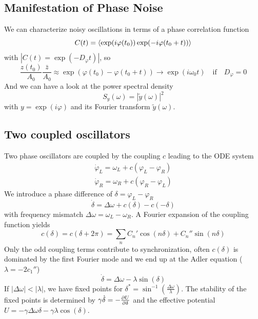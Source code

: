 \documentclass{notebook}
\begin{document}
\subsection*{Manifestation of Phase Noise}

We can characterize noisy oscillations in terms of a phase correlation function
%
\begin{equation}
C(t) = \expval{\exp(i \varphi(t_0)) \exp(-i \varphi(t_0 + t))}
\end{equation}
%
with $|C(t) = \exp(-D_{\varphi} t)|$, so
%
\begin{equation*}
	\frac{z(t_0)}{A_0} \frac{\bar{z}}{A_0} \approx \exp(\varphi(t_0)-\varphi(t_0+t)) \to \exp(i \omega_0 t) \quad \mathrm{if} \quad D_{\varphi} = 0
\end{equation*}
%
And we can have a look at the power spectral density 
%
\begin{equation}
S_y(\omega) = |\tilde{y}(\omega)|^2
\end{equation}
%
with $y = \exp(i \varphi)$ and its Fourier transform $\tilde{y}(\omega)$. 

\subsection*{Two coupled oscillators}

Two phase oscillators are coupled by the coupling $c$ leading to the ODE system
%
\begin{equation}
%
\begin{gathered}
\dot{\varphi}_L = \omega_L + c(\varphi_L - \varphi_R) \\
\dot{\varphi}_R = \omega_R + c(\varphi_R - \varphi_L)
\end{gathered}
%
\end{equation}
%
We introduce a phase difference of $\delta = \varphi_L - \varphi_R$
%
\begin{equation}
\dot{\delta} = \Delta \omega + c(\delta) - c(-\delta)
\end{equation}
%
with frequency mismatch $\Delta \omega = \omega_L - \omega_R$. A Fourier expansion of the coupling function yields 
%
\begin{equation}
c(\delta) = c(\delta + 2 \pi) = \sum_n{C_n' \cos(n \delta) + C_n'' \sin(n \delta)}
\end{equation}
%
Only the odd coupling terms contribute to synchronization, often $c(\delta)$ is dominated by the first Fourier mode and we end up at the Adler equation ($\lambda = - 2 c_1''$)
%
\begin{equation}
\dot{\delta} = \Delta \omega - \lambda \sin(\delta)
\end{equation}
%
If $|\Delta \omega| < |\lambda|$, we have fixed points for $\delta^* = \sin^{-1} \left( \frac{\Delta \omega}{\lambda} \right)$. The stability of the fixed points is determined by $\gamma \dot{\delta} = - \pdv{U}{\delta}$ and the effective potential $U = -\gamma \Delta \omega \delta - \gamma \lambda \cos(\delta)$. 
\end{document}
